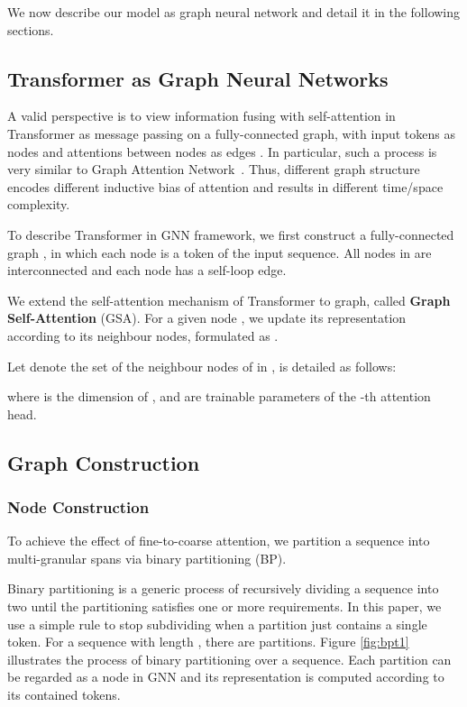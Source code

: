 \documentclass[11pt,a4paper]{article}
\begin{document}
We now describe our model as graph neural network and detail it in the following sections.

\subsection{Transformer as Graph Neural Networks}
\label{sec:trans-gnn}

A valid perspective is to view information fusing with self-attention in Transformer as message passing on a fully-connected graph, with input tokens as nodes and attentions between nodes as edges \cite{battaglia2018relational}. In particular, such a process is very similar to Graph Attention Network~\cite{velickovic2017graph}. Thus, different graph structure encodes different inductive bias of attention and results in different time/space complexity.

To describe Transformer in GNN framework, we first construct a fully-connected graph , in which each node is a token of the input sequence.  All nodes in  are interconnected and each node has a self-loop edge.

We extend the self-attention mechanism of Transformer to graph, called \textbf{Graph Self-Attention} (GSA). For a given node , we update its representation according to its neighbour nodes, formulated as .

Let  denote the set of the neighbour nodes of  in ,  is detailed as follows:

where  is the dimension of , and  are trainable parameters of the -th attention head.



\subsection{Graph Construction}





\subsubsection{Node Construction}

To achieve the effect of fine-to-coarse attention, we partition a sequence into multi-granular spans via binary partitioning (BP).

Binary partitioning is a generic process of recursively dividing a sequence into two until the partitioning satisfies one or more requirements. In this paper, we use a simple rule to stop subdividing when a partition just contains a single token.
For a sequence with length , there are  partitions. Figure \ref{fig:bpt1} illustrates the process of binary partitioning over a sequence.  Each partition can be regarded as a node in GNN and its representation is computed according to its contained tokens.
\end{document}

